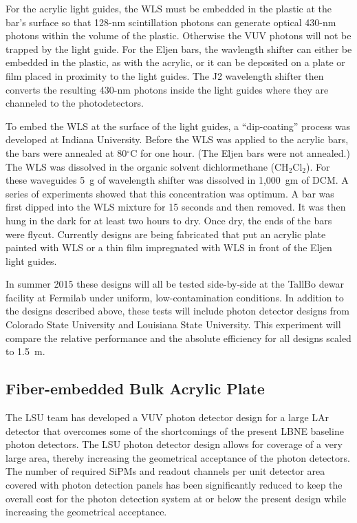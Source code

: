 For the acrylic light guides, the WLS must be embedded in the plastic
at the bar's surface so that 128-nm scintillation photons can generate
optical 430-nm photons within the volume of the plastic.  Otherwise
the VUV photons will not be trapped by the light guide.  For the Eljen
bars, the wavlength shifter can either be embedded in the plastic, as
with the acrylic, or it can be deposited on a plate or film placed in
proximity to the light guides.  The J2 wavelength shifter then
converts the resulting 430-nm photons inside the light guides where
they are channeled to the photodetectors.

To embed the WLS at the surface of the light guides, a ``dip-coating''
process was developed at Indiana University.  Before the WLS was
applied to the acrylic bars, the bars were annealed at 80$^\circ$C for one
hour.  (The Eljen bars were not annealed.)  The WLS was dissolved in the
organic solvent dichlormethane (CH$_2$Cl$_2$).  For these waveguides
5~g of wavelength shifter was dissolved in 1,000~gm of DCM.  A
series of experiments showed that this concentration was optimum.  A
bar was first dipped into the WLS mixture for 15 seconds and then
removed.  It was then hung in the dark for at least two hours to dry.
Once dry, the ends of the bars were flycut.  Currently designs are
being fabricated that put an acrylic plate painted with WLS or a thin
film impregnated with WLS in front of the Eljen light guides.

In summer 2015 these designs will all be tested side-by-side at the
TallBo dewar facility at Fermilab under uniform, low-contamination
conditions.  In addition to the designs described above, these tests
will include photon detector designs from Colorado State University
and Louisiana State University.  This experiment will compare the
relative performance and the absolute efficiency for all designs
scaled to 1.5~m.

\subsection{Fiber-embedded Bulk Acrylic Plate}

The LSU team has developed a VUV photon detector
design for a large LAr detector that overcomes some of the
shortcomings of the present LBNE baseline  photon detectors. The LSU
photon detector design allows for coverage of a very large area, thereby
increasing the geometrical acceptance of the photon detectors. The
number of required SiPMs and readout channels per unit detector area
covered with photon detection panels has been significantly reduced to
keep the overall cost for the photon detection system at or below the
present design while increasing the geometrical acceptance. %

